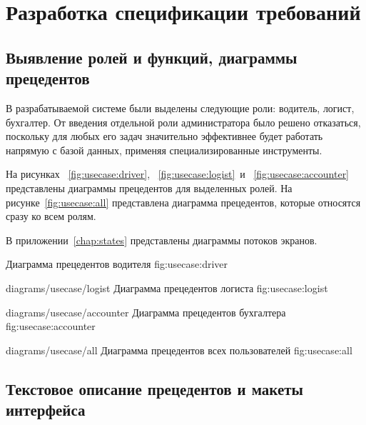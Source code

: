 \chapter{Разработка спецификации требований}
\label{chap:spec}

\section{Выявление ролей и функций, диаграммы прецедентов}
В разрабатываемой системе были выделены следующие роли: 
водитель, логист, бухгалтер. 
От введения отдельной роли администратора было решено отказаться, 
поскольку для любых его задач значительно эффективнее будет работать
напрямую с базой данных, применяя специализированные инструменты.

На рисунках
~\ref{fig:usecase:driver},
~\ref{fig:usecase:logist}~и
~\ref{fig:usecase:accounter} 
представлены диаграммы прецедентов для выделенных ролей.
На рисунке~\ref{fig:usecase:all} представлена диаграмма прецедентов,
которые относятся сразу ко всем ролям.

В приложении~\ref{chap:states} представлены диаграммы потоков экранов.

    {Диаграмма прецедентов водителя}
    {fig:usecase:driver}

\image
    {diagrams/usecase/logist}
    {Диаграмма прецедентов логиста}
    {fig:usecase:logist}

\image
    {diagrams/usecase/accounter}
    {Диаграмма прецедентов бухгалтера}
    {fig:usecase:accounter}

\image
    {diagrams/usecase/all}
    {Диаграмма прецедентов всех пользователей}
    {fig:usecase:all}



\section{Текстовое описание прецедентов и макеты интерфейса}


